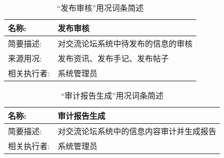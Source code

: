 \begin{table}[H]  
\caption{“发布审核”用况词条简述}  
\begin{center}  
    \begin{tabular}{l p{11cm}} 
        \hline
        \quad 名称:  & 发布审核 \\
        \hline
        \quad 简要描述:  & 对交流论坛系统中待发布的信息的审核 \\
        \hline
        \quad 来源用况:  & 发布资讯、发布手记、发布帖子 \\
        \hline
        \quad 相关执行者:  & 系统管理员 \\
        \hline
    \end{tabular}
    \label{tab1}
\end{center}
\end{table}

\begin{table}[H]  
\caption{“审计报告生成”用况词条简述}  
\begin{center}  
    \begin{tabular}{l p{11cm}} 
        \hline
        \quad 名称:  & 审计报告生成 \\
        \hline
        \quad 简要描述:  & 对交流论坛系统中的信息内容审计并生成报告 \\
        \hline     
        \quad 相关执行者:  & 系统管理员 \\
        \hline
    \end{tabular}
    \label{tab1}
\end{center}
\end{table}